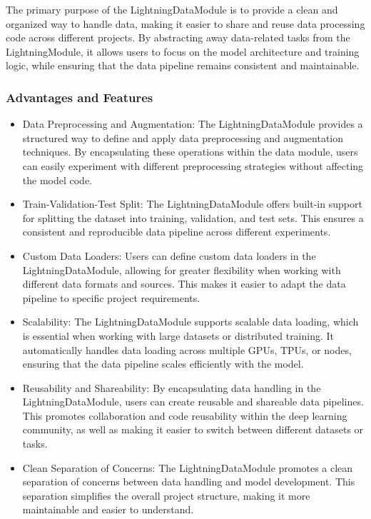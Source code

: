 \documentclass[12pt]{article}
\begin{document}
The primary purpose of the LightningDataModule is to provide a clean and organized way to handle data, making it easier to share and reuse data processing code across different projects.
By abstracting away data-related tasks from the LightningModule, it allows users to focus on the model architecture and training logic, while ensuring that the data pipeline remains consistent and maintainable.

\subsubsection{Advantages and Features}

\begin{itemize}
    \item Data Preprocessing and Augmentation: The LightningDataModule provides a structured way to define and apply data preprocessing and augmentation techniques. By encapsulating these operations within the data module, users can easily experiment with different preprocessing strategies without affecting the model code.
    \item Train-Validation-Test Split: The LightningDataModule offers built-in support for splitting the dataset into training, validation, and test sets. This ensures a consistent and reproducible data pipeline across different experiments.
    \item Custom Data Loaders: Users can define custom data loaders in the LightningDataModule, allowing for greater flexibility when working with different data formats and sources. This makes it easier to adapt the data pipeline to specific project requirements.
    \item Scalability: The LightningDataModule supports scalable data loading, which is essential when working with large datasets or distributed training. It automatically handles data loading across multiple GPUs, TPUs, or nodes, ensuring that the data pipeline scales efficiently with the model.
    \item Reusability and Shareability: By encapsulating data handling in the LightningDataModule, users can create reusable and shareable data pipelines. This promotes collaboration and code reusability within the deep learning community, as well as making it easier to switch between different datasets or tasks.
    \item Clean Separation of Concerns: The LightningDataModule promotes a clean separation of concerns between data handling and model development. This separation simplifies the overall project structure, making it more maintainable and easier to understand.
\end{itemize}
\end{document}
